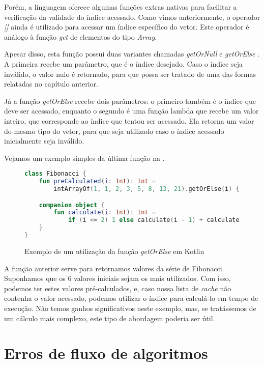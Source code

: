  Porém, a linguagem oferece algumas funções extras nativas para facilitar a verificação da validade do índice acessado. Como vimos anteriormente, o operador \textit{[]} ainda é utilizado para acessar um índice específico do vetor. Este operador é análogo à função \textit{get} de elementos do tipo \textit{Array}. 
 
 Apesar disso, esta função possui duas variantes chamadas \textit{getOrNull} \cite{kotlin_get_or_null} e \textit{getOrElse} \cite{kotlin_get_or_null}. A primeira recebe um parâmetro, que é o índice desejado. Caso o índice seja inválido, o valor nulo é retornado, para que possa ser tratado de uma das formas relatadas no capítulo anterior.

 Já a função \textit{getOrElse} recebe dois parâmetros: o primeiro também é o índice que deve ser acessado, enquanto o segundo é uma função lambda que recebe um valor inteiro, que corresponde ao índice que tentou ser acessado. Ela retorna um valor do mesmo tipo do vetor, para que seja utilizado caso o índice acessado inicialmente seja inválido.

 Vejamos um exemplo simples da última função na .

\begin{figure}[H]
    \centering
    \begin{lstlisting}[language=Kotlin]
class Fibonacci {
    fun preCalculated(i: Int): Int = 
        intArrayOf(1, 1, 2, 3, 5, 8, 13, 21).getOrElse(i) { calculate(it) }

    companion object {
        fun calculate(i: Int): Int = 
            if (i <= 2) 1 else calculate(i - 1) + calculate(i - 2)
    }
}
    \end{lstlisting}
    \caption{Exemplo de um utilização da função \textit{getOrElse} em Kotlin}
    \label{fig:kotlin_get_or_else_array_access}
\end{figure}

 A função anterior serve para retornamos valores da série de Fibonacci. Suponhamos que os 6 valores iniciais sejam os mais utilizados. Com isso, podemos ter estes valores pré-calculados, e, caso nossa lista de \textit{cache} não contenha o valor acessado, podemos utilizar o índice para calculá-lo em tempo de execução. Não temos ganhos significativos neste exemplo, mas, se tratássemos de um cálculo mais complexo, este tipo de abordagem poderia ser útil.

\section{Erros de fluxo de algoritmos}

